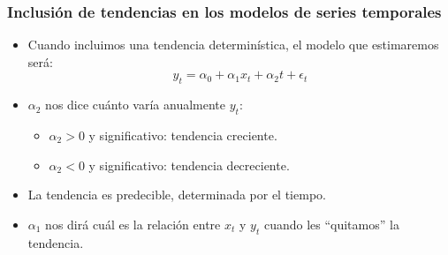 \documentclass{beamer}
\begin{document}
\begin{frame}
\frametitle{Inclusión de tendencias en los modelos de series temporales}

\begin{itemize}
  \item Cuando incluimos una tendencia determinística, el modelo que estimaremos será:
  \[
  y_t = \alpha_0 + \alpha_1 x_t + \alpha_2 t + \epsilon_t
  \]
  \item \(\alpha_2\) nos dice cuánto varía anualmente \( y_t \):
  \begin{itemize}
    \item \(\alpha_2 > 0\) y significativo: tendencia creciente.
    \item \(\alpha_2 < 0\) y significativo: tendencia decreciente.
  \end{itemize}
  \item La tendencia es predecible, determinada por el tiempo.

  \item \(\alpha_1\) nos dirá cuál es la relación entre \( x_t \) y \( y_t \) cuando les “quitamos” la tendencia.
\end{itemize}

\end{frame}
\end{document}
